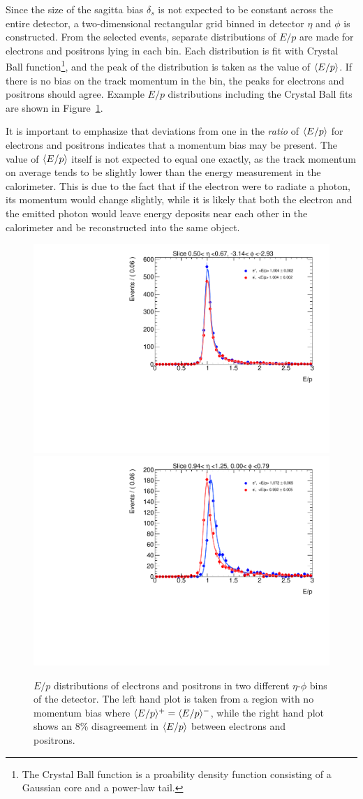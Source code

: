Since the size of the sagitta bias $\delta_s$ is not expected to be constant across the entire detector, a two-dimensional rectangular grid binned in detector $\eta$ and $\phi$ is constructed.
From the selected events, separate distributions of $E/p$ are made for electrons and positrons lying in each bin.
Each distribution is fit with Crystal Ball function\footnote{The Crystal Ball function is a proability density function consisting of a Gaussian core and a power-law tail.}, and the peak of the distribution is taken as the value of $\langle E/p\rangle$.
If there is no bias on the track momentum in the bin, the peaks for electrons and positrons should agree.
Example $E/p$ distributions including the Crystal Ball fits are shown in Figure~\ref{fig:alignment_eop_fit}.

It is important to emphasize that deviations from one in the \emph{ratio} of $\langle E/p\rangle$ for electrons and positrons indicates that a momentum bias may be present.
The value of $\langle E/p\rangle$ itself is not expected to equal one exactly, as the track momentum on average tends to be slightly lower than the energy measurement in the calorimeter.
This is due to the fact that if the electron were to radiate a photon, its momentum would change slightly, while it is likely that both the electron and the emitted photon would leave energy deposits near each other in the calorimeter and be reconstructed into the same object. 

\begin{figure}[htbp]
  \centering
  \includegraphics[width=.48\textwidth]{figs/alignment/eop/eop_fit_nobias}
  \includegraphics[width=.48\textwidth]{figs/alignment/eop/eop_fit_bias}
  \caption{$E/p$ distributions of electrons and positrons in two different $\eta$-$\phi$ bins of the detector.  The left hand plot is taken from a region with no momentum bias where $\langle E/p\rangle^+ = \langle E/p\rangle^-$, while the right hand plot shows an 8\% disagreement in $\langle E/p\rangle$ between electrons and positrons.}
  \label{fig:alignment_eop_fit}
\end{figure}

